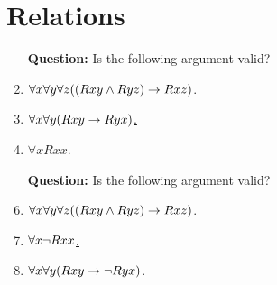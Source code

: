 \documentclass[a4paper, 11pt]{article} %
\begin{document}
\section*{Relations}

\begin{enumerate}
  \item[\bf Question:] Is the following argument valid? 
    \item $\forall x\forall y\forall z((Rxy \wedge Ryz) \rightarrow Rxz)$.
    \item \underline{$\forall x\forall y(Rxy \rightarrow Ryx)$.\quad\quad}
    \item $\forall xRxx$.
  \item[\bf Question:] Is the following argument valid?
    \setcounter{enumi}{0}
    \item $\forall x\forall y\forall z((Rxy \wedge Ryz) \rightarrow Rxz)$.
    \item \underline{$\forall x\neg Rxx$.\quad\quad}
    \item $\forall x\forall y(Rxy \rightarrow \neg Ryx)$.

\end{enumerate}
\end{document}
